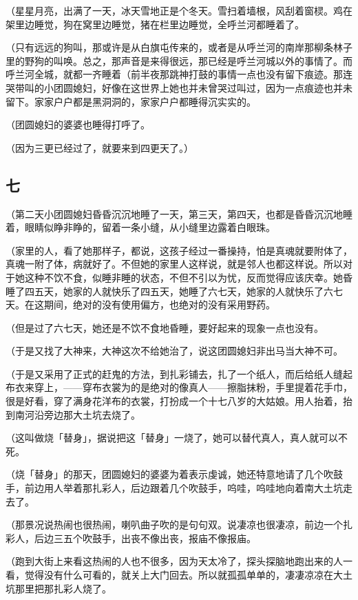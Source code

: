 \documentclass[UTF8]{ctexart}
\begin{document}
（星星月亮，出满了一天，冰天雪地正是个冬天。雪扫着墙根，风刮着窗棂。鸡在架里边睡觉，狗在窝里边睡觉，猪在栏里边睡觉，全呼兰河都睡着了。

（只有远远的狗叫，那或许是从白旗屯传来的，或者是从呼兰河的南岸那柳条林子里的野狗的叫唤。总之，那声音是来得很远，那已经是呼兰河城以外的事情了。而呼兰河全城，就都一齐睡着（前半夜那跳神打鼓的事情一点也没有留下痕迹。那连哭带叫的小团圆媳妇，好像在这世界上她也并未曾哭过叫过，因为一点痕迹也并未留下。家家户户都是黑洞洞的，家家户户都睡得沉实实的。

（团圆媳妇的婆婆也睡得打呼了。

（因为三更已经过了，就要来到四更天了。）

\subsection{七}

（第二天小团圆媳妇昏昏沉沉地睡了一天，第三天，第四天，也都是昏昏沉沉地睡着，眼睛似睁非睁的，留着一条小缝，从小缝里边露着白眼珠。

（家里的人，看了她那样子，都说，这孩子经过一番操持，怕是真魂就要附体了，真魂一附了体，病就好了。不但她的家里人这样说，就是邻人也都这样说。所以对于她这种不饮不食，似睡非睡的状态，不但不引以为忧，反而觉得应该庆幸。她昏睡了四五天，她家的人就快乐了四五天，她睡了六七天，她家的人就快乐了六七天。在这期间，绝对的没有使用偏方，也绝对的没有采用野药。

（但是过了六七天，她还是不饮不食地昏睡，要好起来的现象一点也没有。

（于是又找了大神来，大神这次不给她治了，说这团圆媳妇非出马当大神不可。

（于是又采用了正式的赶鬼的方法，到扎彩铺去，扎了一个纸人，而后给纸人缝起布衣来穿上，——穿布衣裳为的是绝对的像真人——擦脂抹粉，手里提着花手巾，很是好看，穿了满身花洋布的衣裳，打扮成一个十七八岁的大姑娘。用人抬着，抬到南河沿旁边那大土坑去烧了。

（这叫做烧「替身」，据说把这「替身」一烧了，她可以替代真人，真人就可以不死。

（烧「替身」的那天，团圆媳妇的婆婆为着表示虔诚，她还特意地请了几个吹鼓手，前边用人举着那扎彩人，后边跟着几个吹鼓手，呜哇，呜哇地向着南大土坑走去了。

（那景况说热闹也很热闹，喇叭曲子吹的是句句双。说凄凉也很凄凉，前边一个扎彩人，后边三五个吹鼓手，出丧不像出丧，报庙不像报庙。

（跑到大街上来看这热闹的人也不很多，因为天太冷了，探头探脑地跑出来的人一看，觉得没有什么可看的，就关上大门回去。所以就孤孤单单的，凄凄凉凉在大土坑那里把那扎彩人烧了。
\end{document}
